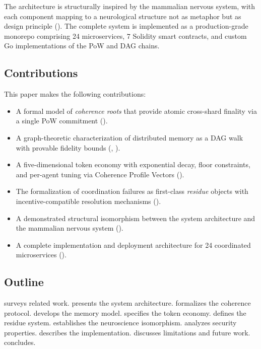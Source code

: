 \documentclass[11pt,twocolumn]{article}
\theoremstyle{definition}
\theoremstyle{plain}
\theoremstyle{remark}
\begin{document}
The architecture is structurally inspired by the mammalian nervous system, with each component mapping to a neurological structure not as metaphor but as design principle (). The complete system is implemented as a production-grade monorepo comprising 24 microservices, 7 Solidity smart contracts, and custom Go implementations of the PoW and DAG chains.

\subsection{Contributions}

This paper makes the following contributions:

\begin{itemize}[leftmargin=*,itemsep=2pt]
  \item A formal model of \emph{coherence roots} that provide atomic cross-shard finality via a single PoW commitment ().
  \item A graph-theoretic characterization of distributed memory as a DAG walk with provable fidelity bounds (, ).
  \item A five-dimensional token economy with exponential decay, floor constraints, and per-agent tuning via Coherence Profile Vectors ().
  \item The formalization of coordination failures as first-class \emph{residue} objects with incentive-compatible resolution mechanisms ().
  \item A demonstrated structural isomorphism between the system architecture and the mammalian nervous system ().
  \item A complete implementation and deployment architecture for 24 coordinated microservices ().
\end{itemize}

\subsection{Outline}

 surveys related work.  presents the system architecture.  formalizes the coherence protocol.  develops the memory model.  specifies the token economy.  defines the residue system.  establishes the neuroscience isomorphism.  analyzes security properties.  describes the implementation.  discusses limitations and future work.  concludes.
\end{document}
